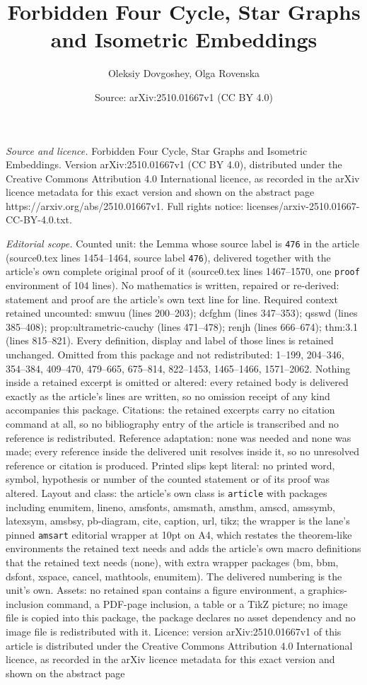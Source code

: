\documentclass[10pt,a4paper]{amsart}
\title[Forbidden Four Cycle, Star Graphs and Isometric Embeddings]{Forbidden Four Cycle, Star Graphs and Isometric Embeddings}
\author{Oleksiy Dovgoshey, Olga Rovenska}
\date{Source: arXiv:2510.01667v1 (CC BY 4.0)}
\begin{document}
\maketitle

\noindent\emph{Source and licence.} Forbidden Four Cycle, Star Graphs and Isometric Embeddings. Version arXiv:2510.01667v1 (CC BY 4.0), distributed under the Creative Commons Attribution 4.0 International licence, as recorded in the arXiv licence metadata for this exact version and shown on the abstract page https://arxiv.org/abs/2510.01667v1. Full rights notice: licenses/arxiv-2510.01667-CC-BY-4.0.txt.\par\smallskip

\noindent\textit{Editorial scope.} Counted unit: the Lemma whose source label is \texttt{476} in the article (source0.tex lines 1454--1464, source label \texttt{476}), delivered together with the article's own complete original proof of it (source0.tex lines 1467--1570, one \texttt{proof} environment of 104 lines). No mathematics is written, repaired or re-derived: statement and proof are the article's own text line for line. Required context retained uncounted: smwuu (lines 200--203); dcfghm (lines 347--353); qsswd (lines 385--408); prop:ultrametric-cauchy (lines 471--478); renjh (lines 666--674); thm:3.1 (lines 815--821). Every definition, display and label of those lines is retained unchanged. Omitted from this package and not redistributed: 1--199, 204--346, 354--384, 409--470, 479--665, 675--814, 822--1453, 1465--1466, 1571--2062. Nothing inside a retained excerpt is omitted or altered: every retained body is delivered exactly as the article's lines are written, so no omission receipt of any kind accompanies this package. Citations: the retained excerpts carry no citation command at all, so no bibliography entry of the article is transcribed and no reference is redistributed. Reference adaptation: none was needed and none was made; every reference inside the delivered unit resolves inside it, so no unresolved reference or citation is produced. Printed slips kept literal: no printed word, symbol, hypothesis or number of the counted statement or of its proof was altered. Layout and class: the article's own class is \texttt{article} with packages including enumitem, lineno, amsfonts, amsmath, amsthm, amscd, amssymb, latexsym, amsbsy, pb-diagram, cite, caption, url, tikz; the wrapper is the lane's pinned \texttt{amsart} editorial wrapper at 10pt on A4, which restates the theorem-like environments the retained text needs and adds the article's own macro definitions that the retained text needs (none), with extra wrapper packages (bm, bbm, dsfont, xspace, cancel, mathtools, enumitem). The delivered numbering is the unit's own. Assets: no retained span contains a figure environment, a graphics-inclusion command, a PDF-page inclusion, a table or a TikZ picture; no image file is copied into this package, the package declares no asset dependency and no image file is redistributed with it. Licence: version arXiv:2510.01667v1 of this article is distributed under the Creative Commons Attribution 4.0 International licence, as recorded in the arXiv licence metadata for this exact version and shown on the abstract page 
\end{document}
